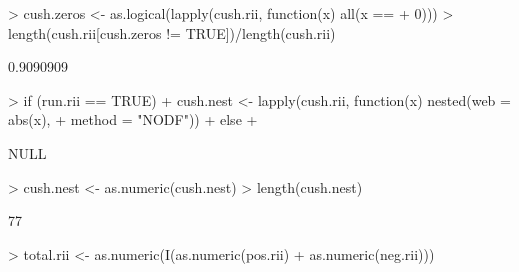 \documentclass[12pt]{article}
\begin{document}
\begin{Schunk}
\begin{Sinput}
> cush.zeros <- as.logical(lapply(cush.rii, function(x) all(x == 
+     0)))
> length(cush.rii[cush.zeros != TRUE])/length(cush.rii)
\end{Sinput}
\begin{Soutput}
[1] 0.9090909
\end{Soutput}
\begin{Sinput}
> if (run.rii == TRUE) {
+     cush.nest <- lapply(cush.rii, function(x) nested(web = abs(x), 
+         method = "NODF"))
+ } else {
+ }
\end{Sinput}
\begin{Soutput}
NULL
\end{Soutput}
\begin{Sinput}
> cush.nest <- as.numeric(cush.nest)
> length(cush.nest)
\end{Sinput}
\begin{Soutput}
[1] 77
\end{Soutput}
\begin{Sinput}
> total.rii <- as.numeric(I(as.numeric(pos.rii) + as.numeric(neg.rii)))
\end{Sinput}
\end{Schunk}
\end{document}
